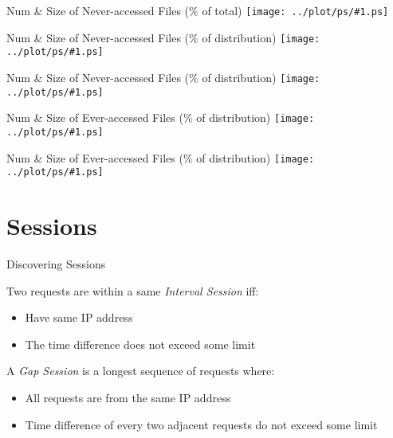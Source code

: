 \documentclass{beamer}
\newcommand\graph[1]{{\texttt{[image: ../plot/ps/\#1.ps]}}}
\begin{document}
\begin{frame}{Num \& Size of Never-accessed Files (\% of total)}
\graph{file-dist-never-req-traffic}
\end{frame}

\begin{frame}{Num \& Size of Never-accessed Files (\% of distribution)}
\graph{file-dist-never-req-percent}
\end{frame}

\begin{frame}{Num \& Size of Never-accessed Files (\% of distribution)}
\graph{file-dist-never-req-percent-traffic}
\end{frame}

\begin{frame}{Num \& Size of Ever-accessed Files (\% of distribution)}
\graph{file-dist-ever-req-percent}
\end{frame}

\begin{frame}{Num \& Size of Ever-accessed Files (\% of distribution)}
\graph{file-dist-ever-req-percent-traffic}
\end{frame}

\section{Sessions}

\begin{frame}{Discovering Sessions}
\begin{definition}
Two requests are within a same \emph{Interval Session} iff:
\begin{itemize}
  \item Have same IP address
  \item The time difference does not exceed some limit
\end{itemize}
\end{definition}

\begin{definition}
A \emph{Gap Session} is a longest sequence of requests where:
\begin{itemize}
  \item All requests are from the same IP address
  \item Time difference of every two adjacent requests do not exceed some limit
\end{itemize}
\end{definition}
\end{frame}
\end{document}
